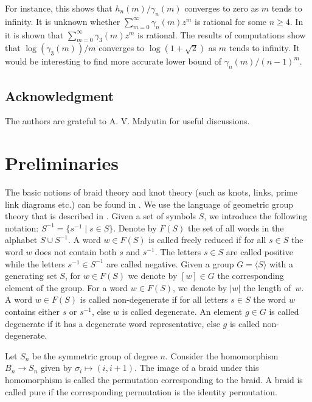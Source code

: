 \documentclass[11pt]{amsart}
\theoremstyle{plain}
\theoremstyle{definition}
\numberwithin{equation}{section}
\begin{document}
For instance, this shows that $h_n(m)/\gamma_n(m)$ converges to zero as $m$ tends to infinity. It is unknown whether $\sum_{m=0}^\infty \gamma_n(m)z^m$ is rational for some $n \geq 4$. In \cite{Sabalka} it is shown that $\sum_{m=0}^\infty \gamma_3(m)z^m$ is rational. The results of computations show that $\log(\gamma_3(m))/m$ converges to $\log (1+\sqrt{2})$ as $m$ tends to infinity. It would be interesting to find more accurate lower bound of $\gamma_n(m)/(n-1)^m$. 

\subsection*{Acknowledgment}
The authors are grateful to A. V. Malyutin for useful discussions.

\section{Preliminaries}

The basic notions of braid theory and knot theory (such as knots, links, prime link diagrams etc.) can be found in \cite{Adams,MurasugiB}. We use the language of geometric group theory that is described in \cite{OH}. Given a set of symbols $S$, we introduce the following notation: $S^{-1} = \{s^{-1} \mid s \in S\}$. Denote by $F(S)$ the set of all words in the alphabet $S\cup S^{-1}$. A word $w \in F(S)$ is called freely reduced if for all $s \in S$ the word $w$ does not contain both $s$ and $s^{-1}$. The letters $s \in S$ are called positive while the letters $s^{-1} \in S^{-1}$ are called negative. Given a group $G = \langle S \rangle$ with a generating set $S$, for $w \in F(S)$ we denote by $[w] \in G$ the corresponding element of the group. For a word $w \in F(S)$, we denote by $|w|$ the length of~$w$. A word $w \in F(S)$ is called non-degenerate if for all letters $s \in S$ the word $w$ contains either $s$ or $s^{-1}$, else $w$ is called degenerate. An element $g \in G$ is called degenerate if it has a degenerate word representative, else $g$ is called non-degenerate.

Let $S_n$ be the symmetric group of degree $n$. Consider the homomorphism $B_n \longrightarrow S_n$ given by $\sigma_i \mapsto (i,i+1)$. The image of a braid under this homomorphism is called the permutation corresponding to the braid. A braid is called pure if the corresponding permutation is the identity permutation. 
\end{document}
